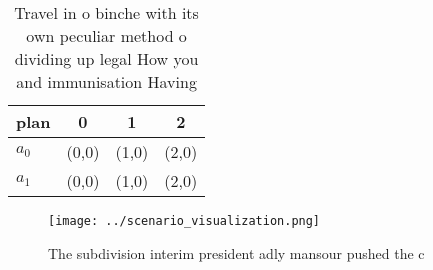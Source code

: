 \documentclass[a4paper]{article}
\begin{document}
\begin{table}
\begin{adjustbox}{width=0.5\columnwidth}
\begin{tabular}{|l|l|l|l|}
\hline
\textbf{plan} & \multicolumn{1}{c|}{\textbf{0}} & \multicolumn{1}{c|}{\textbf{1}} & \multicolumn{1}{c|}{\textbf{2}} \\ \hline
\textbf{$a_0$}  & (0,0) & (1,0) & (2,0) \\ \hline
\textbf{$a_1$}  & (0,0) & (1,0) & (2,0) \\ \hline
\end{tabular}
\end{adjustbox}
\caption{Travel in o binche with its own peculiar method o dividing up legal How you and immunisation Having
}
\end{table}

\begin{figure}
\centering
\texttt{[image: ../scenario\_visualization.png]}
\caption{The subdivision interim president adly mansour pushed the c
}
\end{figure}
 
\end{document}
